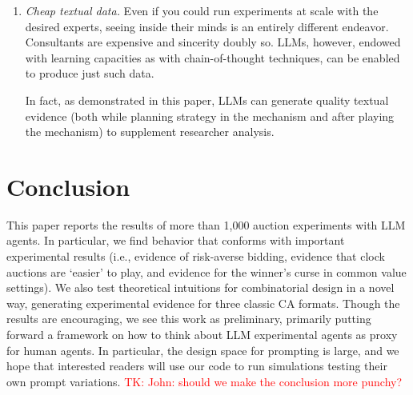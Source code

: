 \documentclass{article} %
\newcommand{\TK}[1]{\textcolor{red}{TK: #1}}
\begin{document}
\begin{enumerate}

    \item \textit{Cheap textual data.} Even if you could run experiments at scale with the desired experts, seeing inside their minds is an entirely different endeavor.
    Consultants are expensive and sincerity doubly so. 
    LLMs, however, endowed with learning capacities as with chain-of-thought techniques, can be enabled to produce just such data.

    In fact, as demonstrated in this paper, LLMs can generate quality textual evidence (both while planning strategy in the mechanism and after playing the mechanism) to supplement researcher analysis. 
\end{enumerate}







\section{Conclusion}
This paper reports the results of more than 1,000 auction experiments with LLM agents. 
In particular, we find behavior that conforms with important experimental results (i.e., evidence of risk-averse bidding, evidence that clock auctions are `easier' to play, and evidence for the winner's curse in common value settings). 
We also test theoretical intuitions for combinatorial design in a novel way, generating experimental evidence for three classic CA formats. 
Though the results are encouraging, we see this work as preliminary,
primarily putting forward a framework on how to think about LLM experimental agents as proxy for human agents.
 In particular, the design space for prompting is large, and we hope that interested readers
 will use our code to run simulations testing their own prompt variations. 
 \TK{John: should we make the conclusion more punchy?}
\end{document}
